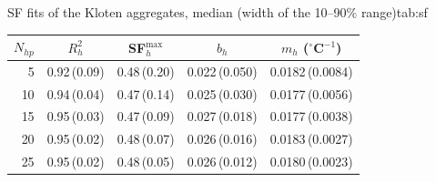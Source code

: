 \begin{autotable}{SF fits of the Kloten aggregates, median (width of the 10--90\% range)}{tab:sf}
\begin{tabular}{rcccc}
\toprule
$N_{hp}$ & $R^2_h$ & SF$^{\max}_h$ & $b_h$ & $m_h$ ($^\circ$C$^{-1}$) \\
\midrule
5 & 0.92\,(0.09) & 0.48\,(0.20) & 0.022\,(0.050) & 0.0182\,(0.0084) \\
10 & 0.94\,(0.04) & 0.47\,(0.14) & 0.025\,(0.030) & 0.0177\,(0.0056) \\
15 & 0.95\,(0.03) & 0.47\,(0.09) & 0.027\,(0.018) & 0.0177\,(0.0038) \\
20 & 0.95\,(0.02) & 0.48\,(0.07) & 0.026\,(0.016) & 0.0183\,(0.0027) \\
25 & 0.95\,(0.02) & 0.48\,(0.05) & 0.026\,(0.012) & 0.0180\,(0.0023) \\
\bottomrule
\end{tabular}
\end{autotable}